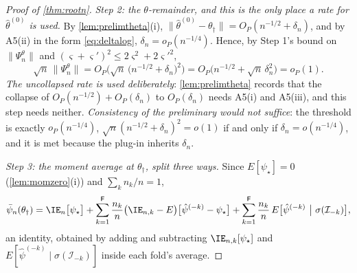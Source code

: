 \begin{proof}[Proof of \cref{thm:rootn}]
\emph{Step 2: the $\theta$-remainder, and this is the only place a \emph{rate} for $\hat\theta^{(0)}$ is
used.} By \cref{lem:prelimtheta}\textup{(i)}, $\|\hat\theta^{(0)}-\theta_\dagger\|=O_P(n^{-1/2}+\delta_n)$, and by
A5(ii) in the form \eqref{eq:deltalog}, $\delta_n=o_P(n^{-1/4})$. Hence, by Step 1's bound on
$\|\Psi^{\theta}_n\|$ and $(\varsigma+\varsigma')^{2}\le2\varsigma^{2}+2\varsigma'^{2}$,
\[
\sqrt n\,\big\|\Psi^{\theta}_n\big\|=O_P\Big(\sqrt n\,\big(n^{-1/2}+\delta_n\big)^{2}\Big)
=O_P\Big(n^{-1/2}+\sqrt n\,\delta_n^{2}\Big)=o_P(1) .
\]
\emph{The uncollapsed rate is used deliberately}: \cref{lem:prelimtheta} records that the collapse of
$O_P(n^{-1/2})+O_P(\delta_n)$ to $O_P(\delta_n)$ needs A5(i) and A5(iii), and this step needs neither.
\emph{Consistency of the preliminary would not suffice}: the threshold is exactly $o_P(n^{-1/4})$, 
$\sqrt n(n^{-1/2}+\delta_n)^{2}=o(1)$ if and only if $\delta_n=o(n^{-1/4})$, and it is met because the
plug-in inherits $\delta_n$.

\emph{Step 3: the moment average at $\theta_\dagger$, split three ways.} Since $E[\psi_\star]=0$
(\cref{lem:momzero}(i)) and $\sum_kn_k/n=1$,
\begin{equation}\label{eq:threeway}
\bar\psi_n(\theta_\dagger)=\IE_n\big[\psi_\star\big]
+\sum_{k=1}^{\mathsf F}\frac{n_k}{n}\big(\IE_{n,k}-E\big)\big[\hat\psi^{(-k)}-\psi_\star\big]
+\sum_{k=1}^{\mathsf F}\frac{n_k}{n}\,E\big[\hat\psi^{(-k)}\ \big|\ \sigma(\mathcal I_{-k})\big] ,
\end{equation}
an identity, obtained by adding and subtracting $\IE_{n,k}[\psi_\star]$ and
$E[\hat\psi^{(-k)}\mid\sigma(\mathcal I_{-k})]$ inside each fold's average.


\end{proof}
